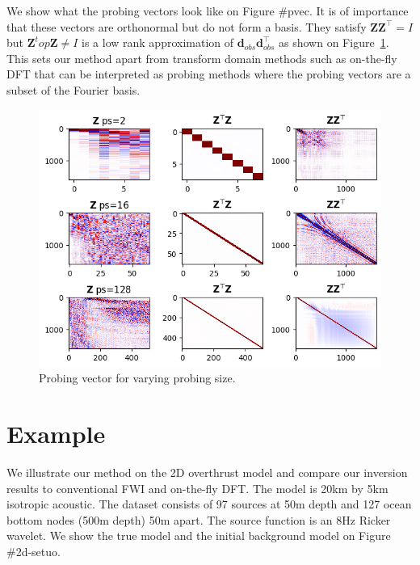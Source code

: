 \documentclass[]{segabs}
\begin{document}
We show what the probing vectors look like on Figure \#pvec. It is of
importance that these vectors are orthonormal but do not form a basis.
They satisfy $\mathbf{Z} \mathbf{Z}^\top = I$ but
$\mathbf{Z}^top \mathbf{Z} \neq I$ is a low rank approximation of
$\mathbf{d}_{obs} \mathbf{d}_{obs}^\top$ as shown on Figure~\ref{pvec}.
This sets our method apart from transform domain methods such as
on-the-fly DFT that can be interpreted as probing methods where the
probing vectors are a subset of the Fourier basis.

\begin{figure}
\centering
\includegraphics[width=1.000\hsize]{./figures/Zi.png}
\caption{Probing vector for varying probing size.}\label{pvec}
\end{figure}

\section{Example}\label{example}

We illustrate our method on the 2D overthrust model and compare our
inversion results to conventional FWI and on-the-fly DFT. The model is
20km by 5km isotropic acoustic. The dataset consists of 97 sources at
50m depth and 127 ocean bottom nodes (500m depth) 50m apart. The source
function is an 8Hz Ricker wavelet. We show the true model and the
initial background model on Figure \#2d-setuo.
\end{document}
